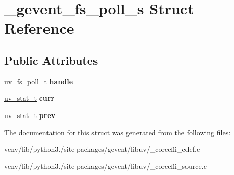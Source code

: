 \hypertarget{struct__gevent__fs__poll__s}{}\section{\+\_\+gevent\+\_\+fs\+\_\+poll\+\_\+s Struct Reference}
\label{struct__gevent__fs__poll__s}
\subsection*{Public Attributes}
\begin{DoxyCompactItemize}
\item 
\mbox{\label{struct__gevent__fs__poll__s_ac25483ae4cf3f1aff74d3107cc30be1d}} 
\hyperlink{structuv__fs__poll__s}{uv\+\_\+fs\+\_\+poll\+\_\+t} {\bfseries handle}
\item 
\mbox{\label{struct__gevent__fs__poll__s_a83e3f26b3bccafaacd7277c2516c540e}} 
\hyperlink{structuv__stat__t}{uv\+\_\+stat\+\_\+t} {\bfseries curr}
\item 
\mbox{\label{struct__gevent__fs__poll__s_a35bed0233fdf7bc41f3a43ce439c0ba3}} 
\hyperlink{structuv__stat__t}{uv\+\_\+stat\+\_\+t} {\bfseries prev}
\end{DoxyCompactItemize}


The documentation for this struct was generated from the following files\+:\begin{DoxyCompactItemize}
\item 
venv/lib/python3./site-\/packages/gevent/libuv/\+\_\+corecffi\+\_\+cdef.\+c\item 
venv/lib/python3./site-\/packages/gevent/libuv/\+\_\+corecffi\+\_\+source.\+c\end{DoxyCompactItemize}
